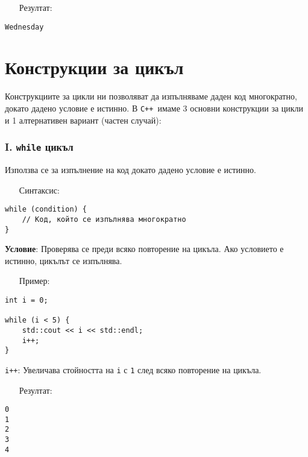 \documentclass[oneside]{book}
\newcommand*{\code}[1]{\texttt{#1}}
\newcommand*{\cpp}{\texttt{C++}\ }
\begin{document}
\begin{itemize}\item[Резултат:]\end{itemize}\vspace{-18pt}
\begin{mdframed}\begin{lstlisting}[language={}]
Wednesday
\end{lstlisting}\end{mdframed}

\section{Конструкции за цикъл}
Конструкциите за цикли ни позволяват да изпълняваме даден код многократно, докато дадено условие е истинно. В \cpp имаме 3 основни конструкции за цикли и 1 алтернативен вариант (частен случай):

\subsubsection{I. \code{while} цикъл}
Използва се за изпълнение на код докато дадено условие е истинно.

\begin{itemize}\item[Синтаксис:]\end{itemize}
\begin{mdframed}\begin{lstlisting}
while (condition) {
    // Код, който се изпълнява многократно
}
\end{lstlisting}\end{mdframed}

\textbf{Условие}: Проверява се преди всяко повторение на цикъла. Ако условието е истинно, цикълът се изпълнява.

\begin{itemize}\item[Пример:]\end{itemize}
\begin{mdframed}\begin{lstlisting}
int i = 0;

while (i < 5) {
    std::cout << i << std::endl;
    i++;
}
\end{lstlisting}\end{mdframed}

\code{i++}: Увеличава стойността на \code{i} с \code{1} след всяко повторение на цикъла.

\begin{itemize}\item[Резултат:]\end{itemize}
\begin{mdframed}\begin{lstlisting}[language={}]
0
1
2
3
4
\end{lstlisting}\end{mdframed}
\end{document}
